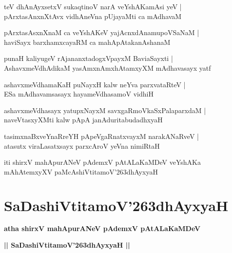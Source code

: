 \documentclass[twoside,12pt,openright]{book}
\def\S{\char'263}
\newcounter{shloka}[chapter]
\begin{document}
\begin{shloka}%
teV dhAnAyxsetxV sukaqtinoV narA veYshAKamAsi yeV |\\
pArxtasAnxnXtAvx vidhAneVna pUjayaMti ca mAdhavaM 
\end{shloka}

\begin{shloka}%
pArxtasAsxnXnaM ca veYshAKeV yajAcnxdAnamupoVSaNaM |\\
haviSayx barxhamxcayaRM ca mahApAtakanAshanaM 
\end{shloka}

\begin{shloka}%
punaH kaliyugeV rAjananxtadogxVpayxM BaviaSayxti |\\
AshavxmeVdhAdikaM yasAmxnAmxhAtamxyXM  mAdhavasayx yatf 
\end{shloka}

\begin{shloka}%
ashavxmeVdhamaKaH puNayxH kalw neYva parxvataRteV |\\
ESa mAdhavamsasayx hayameVdhasamoV vidhiH 
\end{shloka}

\begin{shloka}%
ashavxmeVdhasayx yatupxNayxM savxgaRmoVkaSxPalaparxdaM |\\
naveVtasxyXMti kalw pApA janAduritabudadhxyaH 
\end{shloka}

\begin{shloka}%
tasimxnaBxveYnaRreYH pApeVgaRnatxvayxM narakANaRveV |\\
atasutx viraLasatxsayx parxcAroV yeVna nimiRtaH 
\end{shloka}

\begin{center}
iti shirxV mahApurANeV pAdemxV pAtALaKaMDeV veYshAKa mAhAtemxyXV 
paMcAshiVtitamoV\S dhAyxyaH
\end{center}

\chapter{SaDashiVtitamoV\S dhAyxyaH}

\begin{center}
{\LARGE\bfseries atha shirxV mahApurANeV pAdemxV pAtALaKaMDeV }
\end{center}

\begin{center}         
{\LARGE\bfseries || SaDashiVtitamoV\S dhAyxyaH ||}
\end{center}
\end{document}
